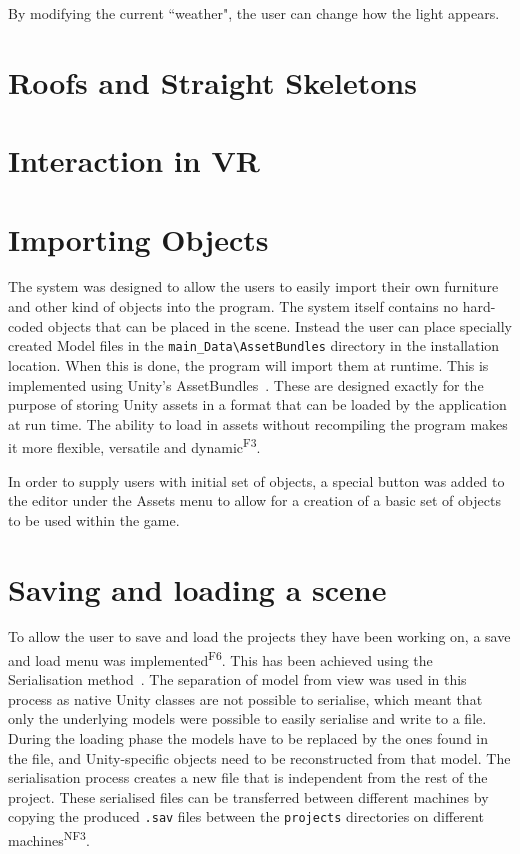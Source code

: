 By modifying the current ``weather", the user can change how the light appears.


\section{Roofs and Straight Skeletons}
\label{sec:roof}



\section{Interaction in VR}
\label{sec:interaction}

\section{Importing Objects}
\label{sec:objects}
\label{sec:import}
The system was designed to allow the users to easily import their own furniture and other kind of objects into the program. The system itself contains no hard-coded objects that can be placed in the scene. Instead the user can place specially created Model files in the \verb|main_Data\AssetBundles| directory in the installation location. When this is done, the program will import them  at runtime. This is implemented using Unity's AssetBundles~\cite{unity:assetbundle}. These are designed exactly for the purpose of storing Unity assets in a format that can be loaded by the application at run time. The ability to load in assets without recompiling the program makes it more flexible, versatile and dynamic\textsuperscript{F3}.

In order to supply users with initial set of objects, a special button was added to the editor under the Assets menu to allow for a creation of a basic set of objects to be used within the game.

\section{Saving and loading a scene}
\label{sec:saving}
To allow the user to save and load the projects they have been working on, a save and load menu was implemented\textsuperscript{F6}. This has been achieved using the Serialisation method~\cite{unity:serialization}. The separation of model from view was used in this process as native Unity classes are not possible to serialise, which meant that only the underlying models were possible to easily serialise and write to a file. During the loading phase the models have to be replaced by the ones found in the file, and Unity-specific objects need to be reconstructed from that model. The serialisation process creates a new file that is independent from the rest of the project. These serialised files can be transferred between different machines by copying the produced \verb|.sav| files between the \verb|projects| directories on different machines\textsuperscript{NF3}.

